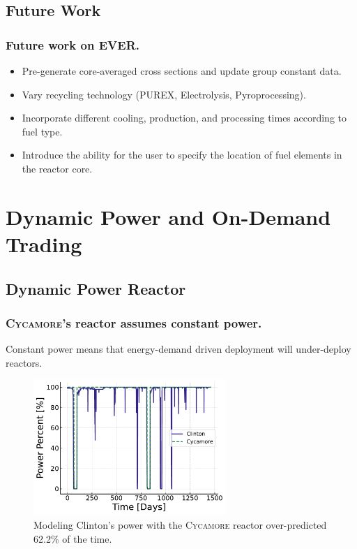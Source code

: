 \documentclass[9pt]{beamer}
\newcommand{\cycamore}{\textsc{Cycamore}\xspace}
\begin{document}
\subsection{Future Work}
\begin{frame}
  \frametitle{Future work on EVER.}
  \begin{itemize}[<+->]
    \item Pre-generate core-averaged cross sections and update group constant data.
    \item Vary recycling technology (PUREX, Electrolysis, Pyroprocessing).
    \item Incorporate different cooling, production, and processing times according to fuel type.
    \item Introduce the ability for the user to specify the location of fuel elements in the reactor core.
  \end{itemize}
\end{frame}

\section{Dynamic Power and On-Demand Trading}

\subsection{Dynamic Power Reactor}
\begin{frame}
  \frametitle{\cycamore's reactor assumes constant power.}
  Constant power means that energy-demand driven deployment will under-deploy reactors.
  \begin{figure}
    \centering
    \includegraphics[width=0.65\textwidth]{images/power_percent_clinton_fake.pdf}
    \caption{Modeling Clinton's power with the \cycamore reactor over-predicted 62.2\% of the time.}
  \end{figure}
\end{frame}
\end{document}
